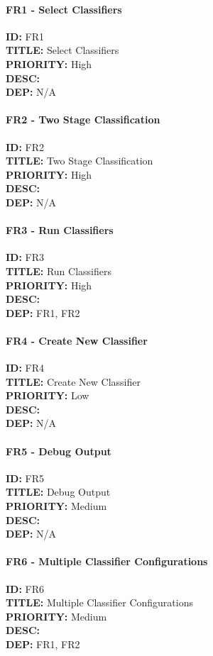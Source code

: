 \paragraph*{FR1 - Select Classifiers}
\textbf{ID:} FR1 \\
\textbf{TITLE:} Select Classifiers \\
\textbf{PRIORITY:} High \\
\textbf{DESC:}   \\
\textbf{DEP:} N/A
\paragraph*{FR2 - Two Stage Classification}
\textbf{ID:} FR2 \\
\textbf{TITLE:} Two Stage Classification \\
\textbf{PRIORITY:} High \\
\textbf{DESC:}   \\
\textbf{DEP:} N/A
\paragraph*{FR3 - Run Classifiers}
\textbf{ID:} FR3 \\
\textbf{TITLE:} Run Classifiers \\
\textbf{PRIORITY:} High \\
\textbf{DESC:}   \\
\textbf{DEP:} FR1, FR2
\paragraph*{FR4 - Create New Classifier}
\textbf{ID:} FR4 \\
\textbf{TITLE:} Create New Classifier \\
\textbf{PRIORITY:} Low \\
\textbf{DESC:}   \\
\textbf{DEP:} N/A
\paragraph*{FR5 - Debug Output}
\textbf{ID:} FR5 \\
\textbf{TITLE:} Debug Output \\
\textbf{PRIORITY:} Medium \\
\textbf{DESC:}   \\
\textbf{DEP:} N/A
\paragraph*{FR6 - Multiple Classifier Configurations}
\textbf{ID:} FR6 \\
\textbf{TITLE:} Multiple Classifier Configurations \\
\textbf{PRIORITY:} Medium \\
\textbf{DESC:}   \\
\textbf{DEP:} FR1, FR2
